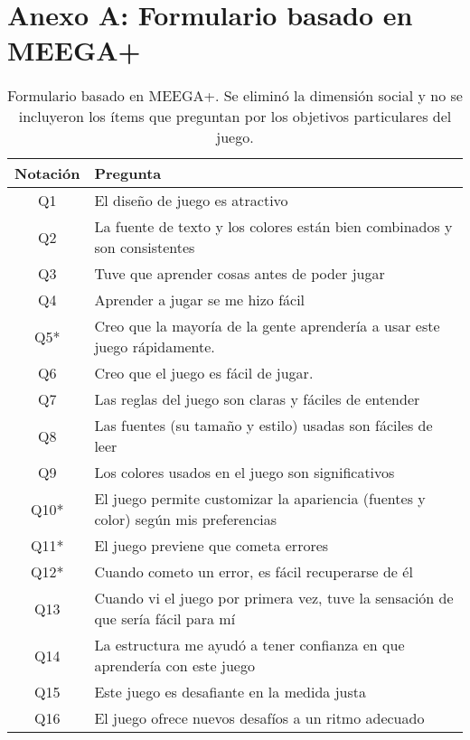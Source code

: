 \chapter*{Anexo A: Formulario basado en MEEGA+} 

\label{AnexoA}


\begin{table}[h]
\centering
\caption{Formulario basado en MEEGA+. Se eliminó la dimensión social y no se incluyeron los ítems que preguntan por los objetivos particulares del juego.}
\label{TablaFormularioMEEGA}
\begin{tabular}{|c|l|} %
\hline %
\textbf{Notación} & \textbf{Pregunta} \\\hline %
Q1       & El diseño de juego es atractivo \\ 
Q2       & La fuente de texto y los colores están bien combinados y son consistentes \\
Q3       & Tuve que aprender cosas antes de poder jugar \\
Q4       & Aprender a jugar se me hizo fácil \\
Q5*      & Creo que la mayoría de la gente aprendería a usar este juego rápidamente. \\
Q6       & Creo que el juego es fácil de jugar. \\
Q7       & Las reglas del juego son claras y fáciles de entender \\
Q8       & Las fuentes (su tamaño y estilo) usadas son fáciles de leer \\
Q9       & Los colores usados en el juego son significativos \\
Q10*     & El juego permite customizar la apariencia (fuentes y color) según mis preferencias \\
Q11*     & El juego previene que cometa errores \\
Q12*     & Cuando cometo un error, es fácil recuperarse de él \\
Q13      & Cuando vi el juego por primera vez, tuve la sensación de que sería fácil para mí \\
Q14      & La estructura me ayudó a tener confianza en que aprendería con este juego \\
Q15      & Este juego es desafiante en la medida justa \\
Q16      & El juego ofrece nuevos desafíos a un ritmo adecuado \\

\end{tabular}
\end{table}
